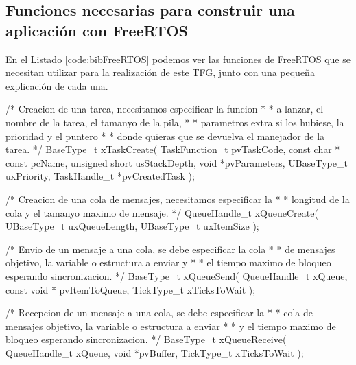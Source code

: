 \subsection{Funciones necesarias para construir una aplicación con FreeRTOS}

En el Listado \ref{code:bibFreeRTOS} podemos ver las funciones de FreeRTOS que se necesitan utilizar para la realización de este TFG, junto con una pequeña explicación de cada una.\\

\begin{listing}[
  language = C,
  rulesepcolor = \color{black},
  caption  = {Funciones necesarias para construir una aplicación con FreeRTOS},
  label    = code:bibFreeRTOS]
  
 /* Creacion de una tarea, necesitamos especificar la funcion   *
  * a lanzar, el nombre de la tarea, el tamanyo de la pila,     *
  * parametros extra si los hubiese, la prioridad y el puntero  *
  * donde quieras que se devuelva el manejador de la tarea.     */
 BaseType_t xTaskCreate( 
                            TaskFunction_t pvTaskCode, 
                            const char * const pcName, 
                            unsigned short usStackDepth, 
                            void *pvParameters, 
                            UBaseType_t uxPriority, 
                            TaskHandle_t *pvCreatedTask 
                          );
                          
 /* Creacion de una cola de mensajes, necesitamos especificar la *
  * longitud de la cola y el tamanyo maximo de mensaje.          */              
 QueueHandle_t xQueueCreate( 
                            UBaseType_t uxQueueLength, 
                            UBaseType_t uxItemSize 
                          );
                          
 /* Envio de un mensaje a una cola, se debe especificar la cola  *
  * de mensajes objetivo, la variable o estructura a enviar y    *
  * el tiempo maximo de bloqueo esperando sincronizacion.        */                          
 BaseType_t xQueueSend( 
                            QueueHandle_t xQueue, 
                            const void * pvItemToQueue, 
                            TickType_t xTicksToWait 
                         );
                         
 /* Recepcion de un mensaje a una cola, se debe especificar la   *
  * cola de mensajes objetivo, la variable o estructura a enviar *
  * y el tiempo maximo de bloqueo esperando sincronizacion.      */                         
 BaseType_t xQueueReceive(
                            QueueHandle_t xQueue,
                            void *pvBuffer,
                            TickType_t xTicksToWait
                         );
\end{listing}

